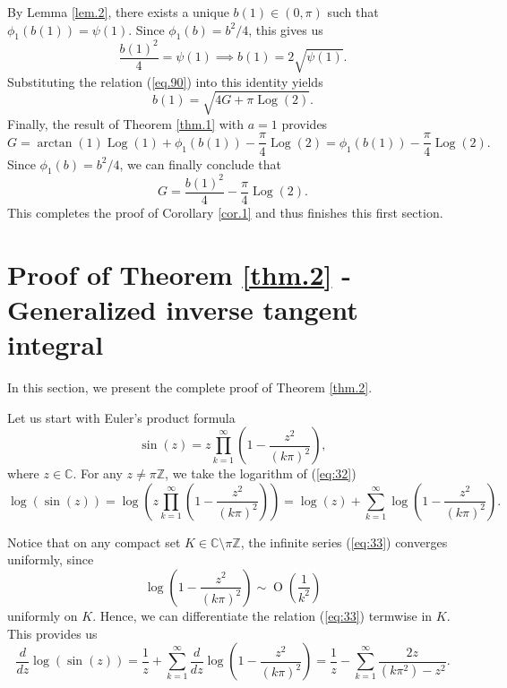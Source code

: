 \documentclass[preprint,12pt,nopreprintline]{elsarticle}
\begin{document}
By Lemma \ref{lem.2}, there exists a unique \(b(1)\in(0,\pi)\) such that \(\phi_1(b(1))=\psi(1)\). Since \(\phi_1(b)=b^2/4\), this gives us
\begin{equation}
\frac{b(1)^2}{4}=\psi(1)\implies b(1)=2\sqrt{\psi(1)}.
\end{equation}
Substituting the relation (\ref{eq.90}) into this identity yields
\begin{equation}
b(1)=\sqrt{4G+\pi\operatorname{Log}\left(2\right)}.
\end{equation}
Finally, the result of Theorem \ref{thm.1} with \(a=1\) provides
\begin{equation}
G
=
\arctan(1)\operatorname{Log}(1)+\phi_1(b(1))-\frac{\pi}{4}\operatorname{Log}\left(2\right)
=
\phi_1(b(1))-\frac{\pi}{4}\operatorname{Log}\left(2\right).
\end{equation}
Since \(\phi_1(b)=b^2/4\), we can finally conclude that
\begin{equation}
G=\frac{b(1)^2}{4}-\frac{\pi}{4}\operatorname{Log}\left(2\right).
\end{equation}
This completes the proof of Corollary \ref{cor.1} and thus finishes this first section.

\section{Proof of Theorem \ref{thm.2} - Generalized inverse tangent integral}

In this section, we present the complete proof of Theorem \ref{thm.2}.

Let us start with Euler’s product formula
\begin{equation}\label{eq:32}
\operatorname{sin}\left(z\right)=z\prod_{k=1}^{\infty}\left(1-\frac{z^2}{\left(k\pi\right)^2}\right),
\end{equation}
where $z\in\mathbb{C}$. For any $z\neq \pi\mathbb{Z}$, we take the logarithm of (\ref{eq:32})
\begin{equation}\label{eq:33}
\operatorname{log}\left(\operatorname{sin}\left(z\right)\right)=\operatorname{log}\left(z\prod_{k=1}^{\infty}\left(1-\frac{z^2}{\left(k\pi\right)^2}\right)\right)=\operatorname{log}\left(z\right)+\sum_{k=1}^{\infty}\operatorname{log}\left(1-\frac{z^2}{\left(k\pi\right)^2}\right).
\end{equation}

\vspace{0.1cm}
Notice that on any compact set $K\in\mathbb{C}\setminus\pi\mathbb{Z}$, the infinite series (\ref{eq:33}) converges uniformly, since
\begin{equation}\label{eq:34}
\operatorname{log}\left(1-\frac{z^2}{\left(k\pi\right)^2}\right)\sim\operatorname{O}\left(\frac{1}{k^2}\right)
\end{equation}
uniformly on $K$. Hence, we can differentiate the relation (\ref{eq:33}) termwise in $K$. This provides us
\begin{equation}\label{eq:35}
\frac{d}{dz}\operatorname{log}\left(\operatorname{sin}\left(z\right)\right)=\frac{1}{z}+\sum_{k=1}^{\infty}\frac{d}{dz}\operatorname{log}\left(1-\frac{z^2}{\left(k\pi\right)^2}\right)=\frac{1}{z}-\sum_{k=1}^{\infty}\frac{2z}{\left(k\pi^2\right)-z^2}.
\end{equation}
\end{document}
